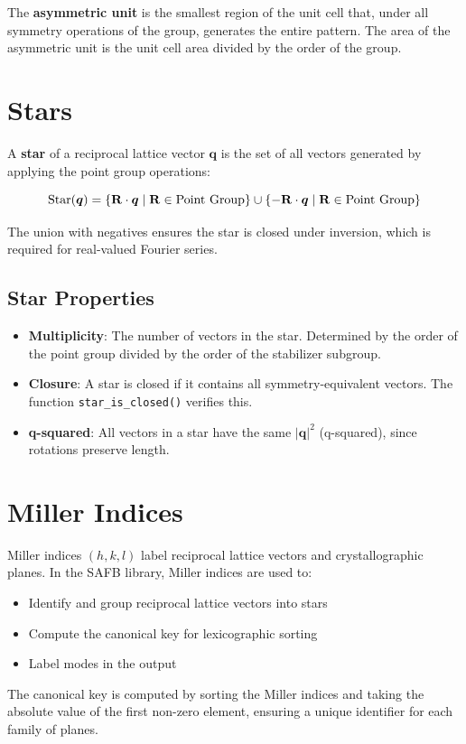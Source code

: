 The \textbf{asymmetric unit} is the smallest region of the unit cell that, under all symmetry operations of the group, generates the entire pattern. The area of the asymmetric unit is the unit cell area divided by the order of the group.

\section{Stars}

A \textbf{star} of a reciprocal lattice vector $\boldsymbol{q}$ is the set of all vectors generated by applying the point group operations:

\begin{equation}
    \text{Star}(\boldsymbol{q}) = \{ \mathbf{R} \cdot \boldsymbol{q} \mid \mathbf{R} \in \text{Point Group} \} \cup \{ -\mathbf{R} \cdot \boldsymbol{q} \mid \mathbf{R} \in \text{Point Group} \}
\end{equation}

The union with negatives ensures the star is closed under inversion, which is required for real-valued Fourier series.

\subsection{Star Properties}

\begin{itemize}
    \item \textbf{Multiplicity}: The number of vectors in the star. Determined by the order of the point group divided by the order of the stabilizer subgroup.
    \item \textbf{Closure}: A star is closed if it contains all symmetry-equivalent vectors. The function \texttt{star\_is\_closed()} verifies this.
    \item \textbf{q-squared}: All vectors in a star have the same $|\boldsymbol{q}|^2$ (q-squared), since rotations preserve length.
\end{itemize}

\section{Miller Indices}

Miller indices $(h, k, l)$ label reciprocal lattice vectors and crystallographic planes. In the SAFB library, Miller indices are used to:

\begin{itemize}
    \item Identify and group reciprocal lattice vectors into stars
    \item Compute the canonical key for lexicographic sorting
    \item Label modes in the output
\end{itemize}

The canonical key is computed by sorting the Miller indices and taking the absolute value of the first non-zero element, ensuring a unique identifier for each family of planes.
